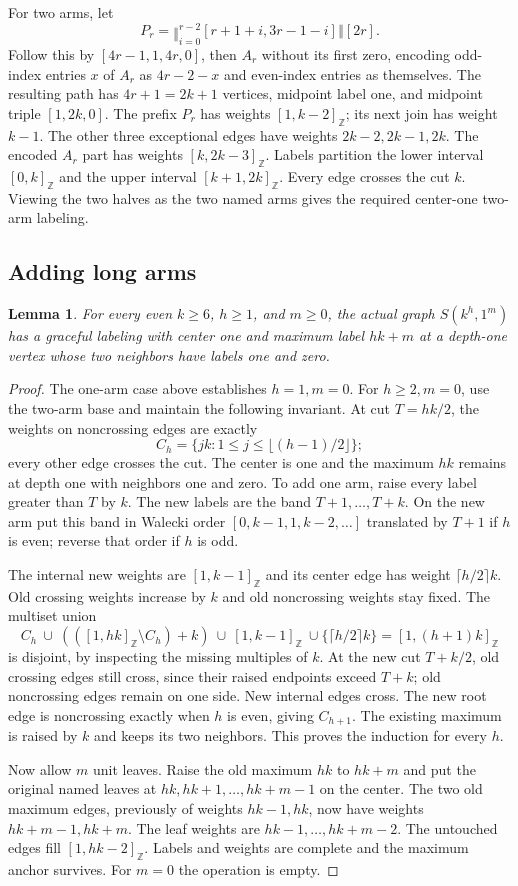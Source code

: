 \documentclass[11pt,a4paper]{article}
\newtheorem{lemma}[theorem]{Lemma}
\theoremstyle{definition}\newtheorem{definition}[theorem]{Definition}
\theoremstyle{remark}\newtheorem{remark}[theorem]{Remark}
\newcommand{\cat}{\mathbin{\Vert}}
\newcommand{\ints}[2]{[#1,#2]_{\mathbb Z}}
\begin{document}
For two arms, let
\[
 P_r=\mathop{\cat}_{i=0}^{r-2}[r+1+i,3r-1-i]\cat[2r].
\]
Follow this by $[4r-1,1,4r,0]$, then $A_r$ without its first zero,
encoding odd-index entries $x$ of $A_r$ as $4r-2-x$ and even-index
entries as themselves. The resulting path has $4r+1=2k+1$ vertices,
midpoint label one, and midpoint triple $[1,2k,0]$.
The prefix $P_r$ has weights $\ints1{k-2}$; its next join has weight
$k-1$. The other three exceptional edges have weights $2k-2,2k-1,2k$.
The encoded $A_r$ part has weights $\ints k{2k-3}$.
Labels partition the lower interval $\ints0k$ and the upper interval
$\ints{k+1}{2k}$. Every edge crosses the cut $k$.
Viewing the two halves as the two named arms gives the required
center-one two-arm labeling.

\subsection{Adding long arms}
\begin{lemma}\label{lem:one}
For every even $k\ge6$, $h\ge1$, and $m\ge0$, the actual graph
$S(k^h,1^m)$ has a graceful labeling with center one and maximum label
$hk+m$ at a depth-one vertex whose two neighbors have labels one and zero.
\end{lemma}
\begin{proof}
The one-arm case above establishes $h=1,m=0$. For $h\ge2,m=0$, use
the two-arm base and maintain the following invariant. At cut $T=hk/2$,
the weights on noncrossing edges are exactly
\[
 C_h=\{jk:1\le j\le\lfloor(h-1)/2\rfloor\};
\]
every other edge crosses the cut. The center is one and the maximum
$hk$ remains at depth one with neighbors one and zero.
To add one arm, raise every label greater than $T$ by $k$.
The new labels are the band $T+1,\ldots,T+k$. On the new arm put this
band in Walecki order
$[0,k-1,1,k-2,\ldots]$ translated by $T+1$ if $h$ is even;
reverse that order if $h$ is odd.

The internal new weights are $\ints1{k-1}$ and its center edge has weight
$\lceil h/2\rceil k$. Old crossing weights increase by $k$ and old
noncrossing weights stay fixed. The multiset union
\[
 C_h\ \cup\ ((\ints1{hk}\setminus C_h)+k)
 \ \cup\ \ints1{k-1}\ \cup\{\lceil h/2\rceil k\}
 =\ints1{(h+1)k}
\]
is disjoint, by inspecting the missing multiples of $k$.
At the new cut $T+k/2$, old crossing edges still cross, since their
raised endpoints exceed $T+k$; old noncrossing edges remain on one side.
New internal edges cross. The new root edge is noncrossing exactly when
$h$ is even, giving $C_{h+1}$. The existing maximum is raised by $k$
and keeps its two neighbors. This proves the induction for every $h$.

Now allow $m$ unit leaves. Raise the old maximum $hk$ to $hk+m$ and put
the original named leaves at $hk,hk+1,\ldots,hk+m-1$ on the center.
The two old maximum edges, previously of weights $hk-1,hk$, now have
weights $hk+m-1,hk+m$. The leaf weights are
$hk-1,\ldots,hk+m-2$. The untouched edges fill $\ints1{hk-2}$.
Labels and weights are complete and the maximum anchor survives.
For $m=0$ the operation is empty.
\end{proof}
\end{document}

